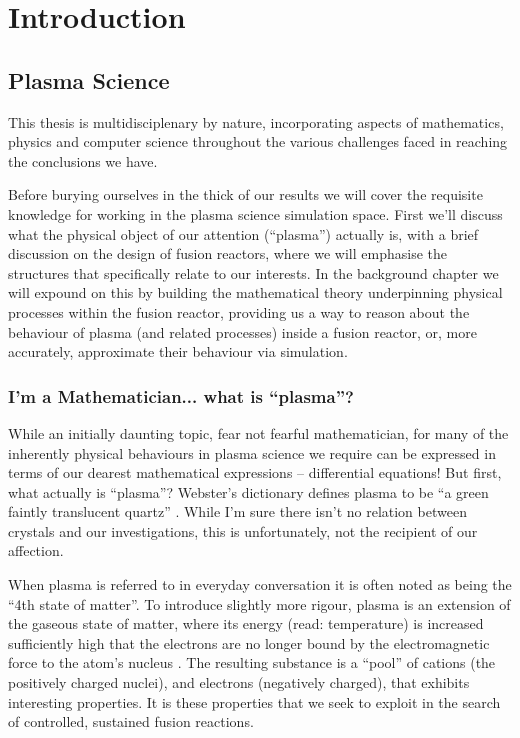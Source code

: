 
\chapter{Introduction}
\label{chapter1}

\section{Plasma Science}

This thesis is multidisciplenary by nature, incorporating aspects of mathematics, physics and computer science throughout 
the various challenges faced in reaching the conclusions we have. 


Before burying ourselves in the thick of our results we 
will cover the requisite knowledge for working in the plasma science simulation space. First we'll discuss what 
the physical object of our attention (``plasma'') actually is, with a brief discussion on the design of fusion reactors, where we will 
emphasise the structures that specifically relate to our interests. In the background chapter we will expound on this by 
building the mathematical theory underpinning physical processes within the fusion reactor, providing us a way to reason
about the behaviour of plasma (and related processes) inside a fusion reactor, or, more accurately, approximate their behaviour 
via simulation.




\subsection{I'm a Mathematician... what is ``plasma''?}

While an initially daunting topic, fear not fearful mathematician, for many of the inherently physical 
behaviours in plasma science we require can be expressed in terms of our dearest mathematical expressions -- differential equations! 
But first, what actually is ``plasma''? Webster's dictionary defines plasma to be ``a green faintly translucent quartz'' \cite{websters_plasma}. 
While I'm sure there isn't no relation between crystals and our investigations, this is unfortunately, not the recipient of our affection. 

When plasma is referred to in everyday conversation it is often noted as being the ``4th state of matter''. To introduce slightly more rigour,
plasma is an extension of the gaseous state of matter, where its energy (read: temperature) is increased sufficiently high that the electrons 
are no longer bound by the electromagnetic force to the atom's nucleus \cite{basics-of-plasma-astrophysics}. The resulting substance is a ``pool'' of cations (the positively charged nuclei), and 
electrons (negatively charged), that exhibits interesting properties. It is these properties that we seek to exploit in the search of controlled, 
sustained fusion reactions.

